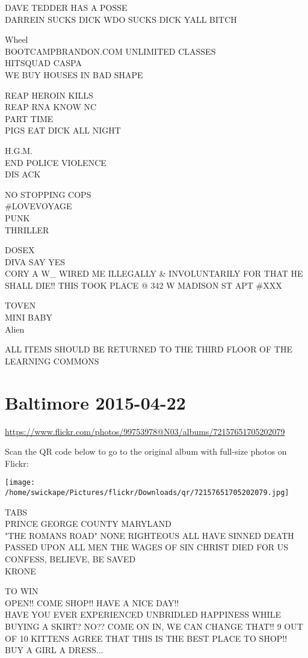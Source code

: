 \documentclass[10pt,letterpaper]{article}
\begin{document}
DAVE TEDDER HAS A POSSE\\
DARREIN SUCKS DICK WDO SUCKS DICK YALL BITCH

Wheel\\
BOOTCAMPBRANDON.COM UNLIMITED CLASSES\\
HITSQUAD CASPA\\
WE BUY HOUSES IN BAD SHAPE

REAP HEROIN KILLS\\
REAP RNA KNOW NC\\
PART TIME\\
PIGS EAT DICK ALL NIGHT

H.G.M.\\
END POLICE VIOLENCE\\
DIS ACK

NO STOPPING COPS\\
\#LOVEVOYAGE\\
PUNK\\
THRILLER

DOSEX\\
DIVA SAY YES\\
CORY A W\_ WIRED ME ILLEGALLY \& INVOLUNTARILY FOR THAT HE SHALL DIE!! THIS TOOK PLACE @ 342 W MADISON ST APT \#XXX

TOVEN\\
MINI BABY\\
Alien

ALL ITEMS SHOULD BE RETURNED TO THE THIRD FLOOR OF THE LEARNING COMMONS


\section*{Baltimore 2015-04-22}

\url{https://www.flickr.com/photos/99753978@N03/albums/72157651705202079}

Scan the QR code below to go to the original album with full-size photos on Flickr:

\texttt{[image: /home/swickape/Pictures/flickr/Downloads/qr/72157651705202079.jpg]}


TABS\\
PRINCE GEORGE COUNTY MARYLAND\\
"THE ROMANS ROAD" NONE RIGHTEOUS ALL HAVE SINNED DEATH PASSED UPON ALL MEN THE WAGES OF SIN CHRIST DIED FOR US CONFESS, BELIEVE, BE SAVED\\
KRONE

TO WIN\\
OPEN!!  COME SHOP!!  HAVE A NICE DAY!!\\
HAVE YOU EVER EXPERIENCED UNBRIDLED HAPPINESS WHILE BUYING A SKIRT?  NO??  COME ON IN, WE CAN CHANGE THAT!!  9 OUT OF 10 KITTENS AGREE THAT THIS IS THE BEST PLACE TO SHOP!!\\
BUY A GIRL A DRESS...
\end{document}
